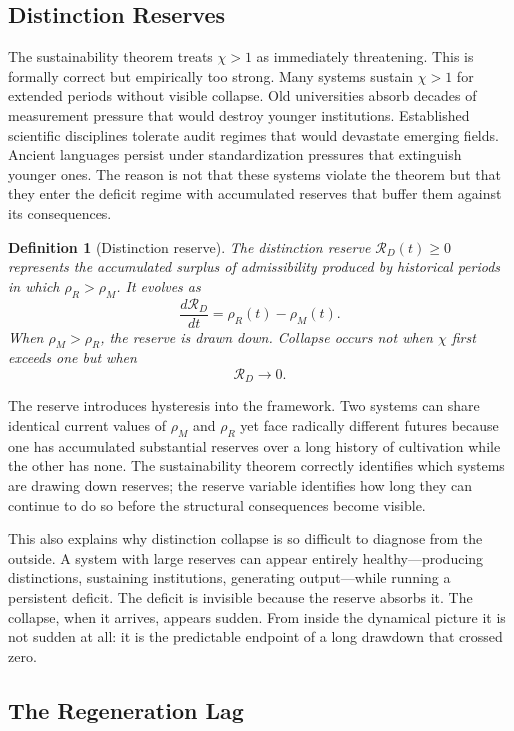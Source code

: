 \documentclass[12pt, a4paper]{article}
\theoremstyle{flyxion}
\newtheorem{definition}{Definition}
\newcommand{\rhoM}{\rho_{M}}
\newcommand{\rhoR}{\rho_{R}}
\begin{document}
\subsection*{Distinction Reserves}

The sustainability theorem treats $\chi > 1$ as immediately threatening. This is formally correct but empirically too strong. Many systems sustain $\chi > 1$ for extended periods without visible collapse. Old universities absorb decades of measurement pressure that would destroy younger institutions. Established scientific disciplines tolerate audit regimes that would devastate emerging fields. Ancient languages persist under standardization pressures that extinguish younger ones. The reason is not that these systems violate the theorem but that they enter the deficit regime with accumulated reserves that buffer them against its consequences.

\begin{definition}[Distinction reserve]
The distinction reserve $\mathcal{R}_D(t) \geq 0$ represents the accumulated surplus of admissibility produced by historical periods in which $\rhoR > \rhoM$. It evolves as
\[
  \frac{d\mathcal{R}_D}{dt} = \rhoR(t) - \rhoM(t).
\]
When $\rhoM > \rhoR$, the reserve is drawn down. Collapse occurs not when $\chi$ first exceeds one but when
\[
  \mathcal{R}_D \to 0.
\]
\end{definition}

The reserve introduces hysteresis into the framework. Two systems can share identical current values of $\rhoM$ and $\rhoR$ yet face radically different futures because one has accumulated substantial reserves over a long history of cultivation while the other has none. The sustainability theorem correctly identifies which systems are drawing down reserves; the reserve variable identifies how long they can continue to do so before the structural consequences become visible.

This also explains why distinction collapse is so difficult to diagnose from the outside. A system with large reserves can appear entirely healthy---producing distinctions, sustaining institutions, generating output---while running a persistent deficit. The deficit is invisible because the reserve absorbs it. The collapse, when it arrives, appears sudden. From inside the dynamical picture it is not sudden at all: it is the predictable endpoint of a long drawdown that crossed zero.

\subsection*{The Regeneration Lag}
\end{document}
